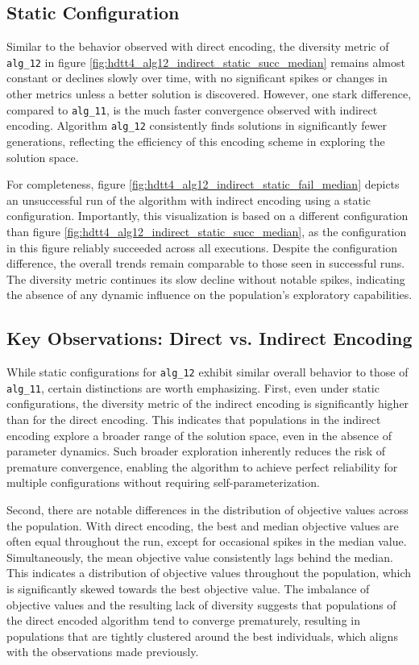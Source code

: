 \documentclass[english,examples]{isasthesis}
\begin{document}
\subsection{Static Configuration}
Similar to the behavior observed with direct encoding, the diversity metric
of \texttt{alg\_12} in figure \ref{fig:hdtt4_alg12_indirect_static_succ_median}
remains almost constant or declines slowly over time, with no significant
spikes or changes in other metrics unless a better solution is discovered.
However, one stark difference, compared to \texttt{alg\_11}, is the much
faster convergence observed with indirect encoding. Algorithm \texttt{alg\_12}
consistently finds solutions in significantly fewer generations, reflecting the
efficiency of this encoding scheme in exploring the solution space.

For completeness, figure \ref{fig:hdtt4_alg12_indirect_static_fail_median}
depicts an unsuccessful run of the algorithm with indirect encoding using a
static configuration. Importantly, this visualization is based on a different
configuration than figure \ref{fig:hdtt4_alg12_indirect_static_succ_median},
as the configuration in this figure reliably succeeded across all executions.
Despite the configuration difference, the overall trends remain comparable to
those seen in successful runs. The diversity metric continues its slow decline
without notable spikes, indicating the absence of any dynamic influence on the
population's exploratory capabilities.

\subsection{Key Observations: Direct vs. Indirect Encoding}
While static configurations for \texttt{alg\_12} exhibit similar overall
behavior to those of \texttt{alg\_11}, certain distinctions are worth
emphasizing. First, even under static configurations, the diversity metric
of the indirect encoding is significantly higher than for the direct encoding.
This indicates that populations in the indirect encoding explore a broader
range of the solution space, even in the absence of parameter dynamics. Such
broader exploration inherently reduces the risk of premature convergence,
enabling the algorithm to achieve perfect reliability for multiple
configurations without requiring self-parameterization.

Second, there are notable differences in the distribution of objective values
across the population. With direct encoding, the best and median objective
values are often equal throughout the run, except for occasional spikes in the
median value. Simultaneously, the mean objective value consistently lags behind
the median. This indicates a distribution of objective values throughout
the population, which is significantly skewed towards the best objective value.
The imbalance of objective values and the resulting lack of diversity suggests
that populations of the direct encoded algorithm tend to converge prematurely,
resulting in populations that are tightly clustered around the best individuals,
which aligns with the observations made previously.
\end{document}
